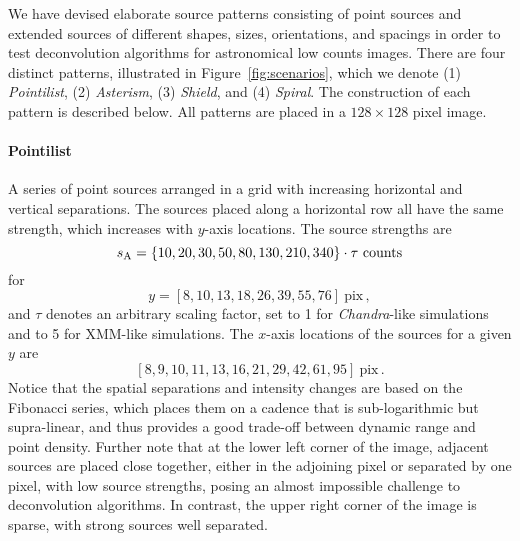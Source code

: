 \documentclass[twocolumn]{aastex631}
\begin{document}
    \label{sec:app:A}

    We have devised elaborate source patterns consisting of point sources and extended sources of different shapes, sizes, orientations, and spacings in order to test deconvolution algorithms for astronomical low counts images.  There are four distinct patterns, illustrated in Figure~\ref{fig:scenarios}, which we denote (1) {\sl Pointilist}, (2) {\sl Asterism}, (3) {\sl Shield}, and (4) {\sl Spiral}.  The construction of each pattern is described below.  All patterns are placed in a $128{\times}128$ pixel image.

    \paragraph{Pointilist} A series of point sources arranged in a grid with increasing horizontal and vertical separations.  The sources placed along a horizontal row all have the same strength, which increases with $y$-axis locations.  The source strengths are 
    $$s_{\rm A} = \{10, 20, 30, 50, 80, 130, 210, 340\} \cdot \tau ~\textrm{counts} $$
    for
    $$y = [8, 10, 13, 18, 26, 39, 55, 76]~\textrm{pix} \,,$$
    and $\tau$ denotes an arbitrary scaling factor, set to 1 for \textit{Chandra}-like simulations and to 5 for XMM-like simulations.
    The $x$-axis locations of the sources for a given $y$ are
    $$[8, 9, 10, 11, 13, 16, 21, 29, 42, 61, 95]~\textrm{pix} \,.$$
    Notice that the spatial separations and intensity changes are based on the Fibonacci series, which places them on a cadence that is sub-logarithmic but supra-linear, and thus provides a good trade-off between dynamic range and point density.  Further note that at the lower left corner of the image, adjacent sources are placed close together, either in the adjoining pixel or separated by one pixel, with low source strengths, posing an almost impossible challenge to deconvolution algorithms.  In contrast, the upper right corner of the image is sparse, with strong sources well separated.
\end{document}
